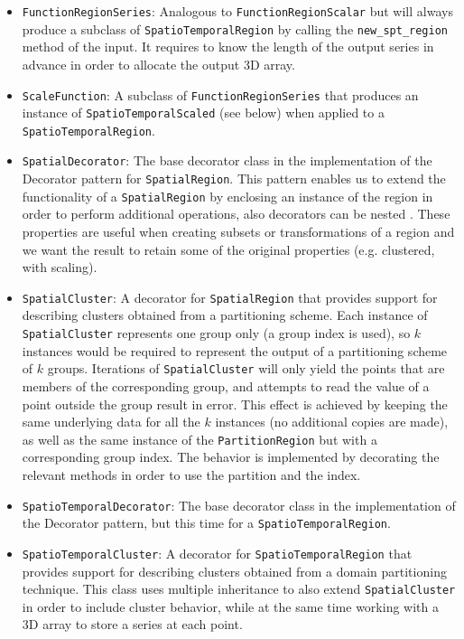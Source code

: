 \begin{itemize}
	\item \texttt{FunctionRegionSeries}: Analogous to \texttt{FunctionRegionScalar} but will always produce a subclass of \texttt{SpatioTemporalRegion} by calling the \texttt{new\_spt\_region} method of the input. It requires to know the length of the output series in advance in order to allocate the output 3D array.
	
	\item \texttt{ScaleFunction}: A subclass of \texttt{FunctionRegionSeries} that produces an instance of \texttt{SpatioTemporalScaled} (see below) when applied to a \texttt{SpatioTemporalRegion}.
	
	\item \texttt{SpatialDecorator}: The base decorator class in the implementation of the Decorator pattern for \texttt{SpatialRegion}. This pattern enables us to extend the functionality of a \texttt{SpatialRegion} by enclosing an instance of the region in order to perform additional operations, also decorators can be nested \cite{Gamma1994}. These properties are useful when creating subsets or transformations of a region and we want the result to retain some of the original properties (e.g. clustered, with scaling).
	
	\item \texttt{SpatialCluster}: A decorator for \texttt{SpatialRegion} that provides support for describing clusters obtained from a partitioning scheme. Each instance of \texttt{SpatialCluster} represents one group only (a group index is used), so $k$ instances would be required to represent the output of a partitioning scheme of $k$ groups. Iterations of \texttt{SpatialCluster} will only yield the points that are members of the corresponding group, and attempts to read the value of a point outside the group result in error. This effect is achieved by keeping the same underlying data for all the $k$ instances (no additional copies are made), as well as the same instance of the  \texttt{PartitionRegion} but with a corresponding group index. The behavior is implemented by decorating the relevant methods in order to use the partition and the index.
	
	\item \texttt{SpatioTemporalDecorator}: The base decorator class in the implementation of the Decorator pattern, but this time for a \texttt{SpatioTemporalRegion}.
	
	\item \texttt{SpatioTemporalCluster}: A decorator for \texttt{SpatioTemporalRegion} that provides support for describing clusters obtained from a domain partitioning technique. This class uses multiple inheritance to also extend \texttt{SpatialCluster} in order to include cluster behavior, while at the same time working with a 3D array to store a series at each point.
	

\end{itemize}
